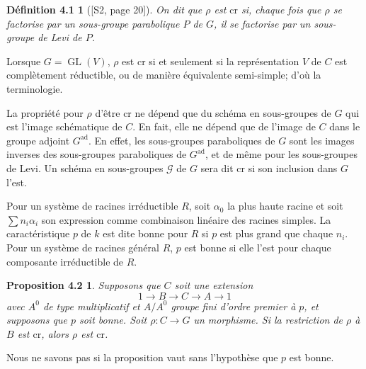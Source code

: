 \documentclass[11pt]{article}
\newcommand{\GL}{\operatorname{GL}}
\newtheorem*{definition41}{Définition 4.1}
\newtheorem*{proposition42}{Proposition 4.2}
\begin{document}
\begin{definition41}[{[S2, page 20]}]
On dit que \(\rho\) est \(\mathrm{cr}\) si, chaque fois que \(\rho\) se factorise par un
sous-groupe parabolique \(P\) de \(G\), il se factorise par un sous-groupe de Levi de
\(P\).
\end{definition41}

Lorsque \(G=\GL(V)\), \(\rho\) est \(\mathrm{cr}\) si et seulement si la représentation
\(V\) de \(C\) est complètement réductible, ou de manière équivalente semi-simple; d'où la
terminologie.

La propriété pour \(\rho\) d'être \(\mathrm{cr}\) ne dépend que du schéma en sous-groupes
de \(G\) qui est l'image schématique de \(C\). En fait, elle ne dépend que de l'image de
\(C\) dans le groupe adjoint \(G^{\mathrm{ad}}\). En effet, les sous-groupes paraboliques de
\(G\) sont les images inverses des sous-groupes paraboliques de \(G^{\mathrm{ad}}\), et de même
pour les sous-groupes de Levi. Un schéma en sous-groupes \(\mathcal G\) de \(G\) sera dit
\(\mathrm{cr}\) si son inclusion dans \(G\) l'est.

Pour un système de racines irréductible \(R\), soit \(\alpha_0\) la plus haute racine et
soit \(\sum n_i\alpha_i\) son expression comme combinaison linéaire des racines simples.
La caractéristique \(p\) de \(k\) est dite bonne pour \(R\) si \(p\) est plus grand que
chaque \(n_i\). Pour un système de racines général \(R\), \(p\) est bonne si elle l'est
pour chaque composante irréductible de \(R\).

\begin{proposition42}
Supposons que \(C\) soit une extension
\begin{equation}
  1\longrightarrow B\longrightarrow C\longrightarrow A\longrightarrow 1
  \tag{4.2.1}
\end{equation}
avec \(A^0\) de type multiplicatif et \(A/A^0\) groupe fini d'ordre premier à \(p\), et
supposons que \(p\) soit bonne. Soit \(\rho:C\to G\) un morphisme. Si la restriction de
\(\rho\) à \(B\) est \(\mathrm{cr}\), alors \(\rho\) est \(\mathrm{cr}\).
\end{proposition42}

Nous ne savons pas si la proposition vaut sans l'hypothèse que \(p\) est bonne.
\end{document}
